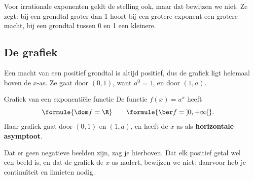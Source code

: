 Voor irrationale exponenten geldt de stelling ook, maar dat bewijzen we niet. Ze zegt: bij een grondtal groter dan 1 hoort bij een grotere exponent een grotere macht, bij een grondtal tussen 0 en 1 een kleinere.


\begin{oefeningen}
\end{oefeningen}

\subsection{De grafiek}

Een macht van een positief grondtal is altijd positief, dus de grafiek ligt helemaal boven de $x$-as. Ze gaat door $(0, 1)$, want $a^0 = 1$, en door $(1, a)$.

\begin{theorie}
\begin{stelling}{Grafiek van een exponentiële functie}
De functie $f(x) = a^x$ heeft
\[\formule{\dom f = \R} \qquad \formule{\ber f = \left]0, +\infty\right[}.\]
Haar grafiek gaat door $(0, 1)$ en $(1, a)$, en heeft de $x$-as als \textbf{\textcolor{accent}{horizontale asymptoot}}.
\end{stelling}
\end{theorie}

Dat er geen negatieve beelden zijn, zag je hierboven. Dat elk positief getal wel een beeld is, en dat de grafiek de $x$-as nadert, bewijzen we niet: daarvoor heb je continuïteit en limieten nodig.


